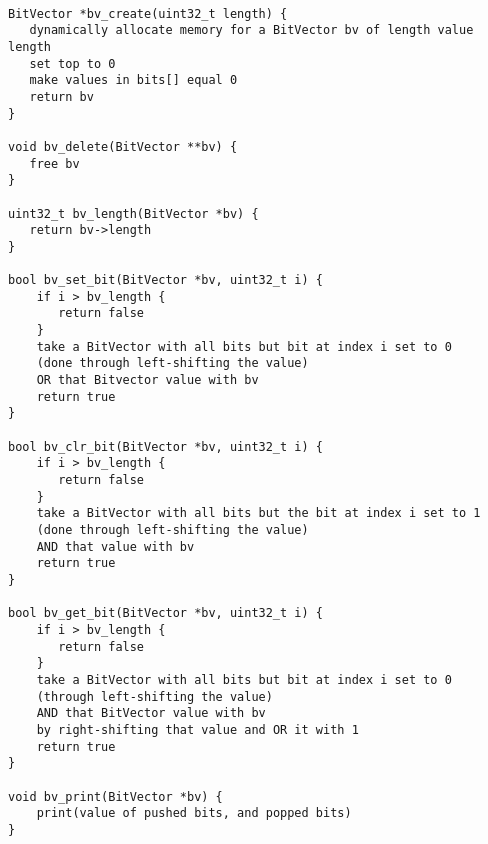 \documentclass[11pt]{article}
\begin{document}
\begin{verbatim}

BitVector *bv_create(uint32_t length) {
   dynamically allocate memory for a BitVector bv of length value length
   set top to 0
   make values in bits[] equal 0
   return bv
}

void bv_delete(BitVector **bv) {
   free bv
}

uint32_t bv_length(BitVector *bv) {
   return bv->length
}

bool bv_set_bit(BitVector *bv, uint32_t i) {
    if i > bv_length {
       return false
    }
    take a BitVector with all bits but bit at index i set to 0 
    (done through left-shifting the value)
    OR that Bitvector value with bv
    return true
}

bool bv_clr_bit(BitVector *bv, uint32_t i) {
    if i > bv_length {
       return false
    }
    take a BitVector with all bits but the bit at index i set to 1
    (done through left-shifting the value)
    AND that value with bv
    return true
}

bool bv_get_bit(BitVector *bv, uint32_t i) {
    if i > bv_length {
       return false
    }
    take a BitVector with all bits but bit at index i set to 0 
    (through left-shifting the value)
    AND that BitVector value with bv
    by right-shifting that value and OR it with 1
    return true
}

void bv_print(BitVector *bv) {
    print(value of pushed bits, and popped bits)
}

\end{verbatim}
\end{document}
